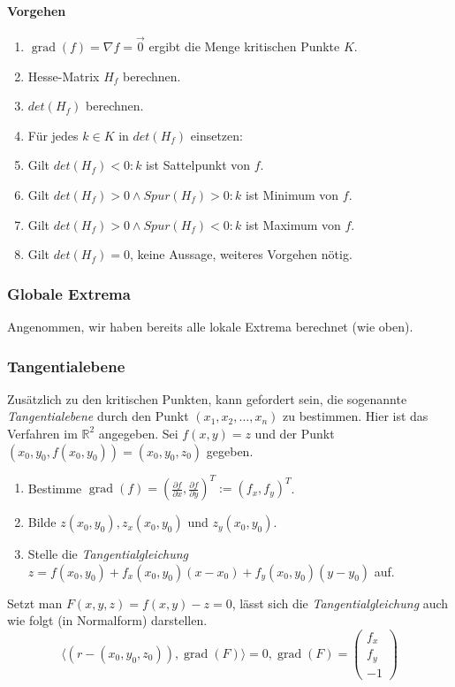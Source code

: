 \documentclass[a4paper, 9pt, DIV=24]{scrartcl}
\DeclareMathOperator{\grad}{grad}
\newcommand{\R}{\mathbb{R}}
\begin{document}
\paragraph{Vorgehen}
\begin{enumerate}[label={(}\arabic*{)}]
 \item $\grad(f) = \nabla f = \vec{0}$ ergibt die Menge kritischen Punkte $K$.
 \item Hesse-Matrix $H_f$ berechnen.
 \item $det(H_f)$ berechnen.
 \item Für jedes $k\in K$ in $det(H_f)$ einsetzen:
 \item Gilt $det(H_f) < 0: k$ ist Sattelpunkt von $f$.
 \item Gilt $det(H_f) > 0 \wedge Spur(H_f) > 0: k$ ist Minimum von $f$.
 \item Gilt $det(H_f) > 0 \wedge Spur(H_f) < 0: k$ ist Maximum von $f$.
 \item Gilt $det(H_f) = 0$, keine Aussage, weiteres Vorgehen nötig.
\end{enumerate}

\subsubsection{Globale Extrema}
Angenommen, wir haben bereits alle lokale Extrema berechnet (wie oben).

\subsubsection{Tangentialebene}
Zusätzlich zu den kritischen Punkten, kann gefordert sein, die sogenannte \emph{Tangentialebene} durch den Punkt $(x_1, x_2, \dots, x_n)$ zu bestimmen.
Hier ist das Verfahren im $\R^2$ angegeben.
Sei $f(x,y) = z$ und der Punkt $(x_0, y_0, f(x_0, y_0)) = (x_0, y_0, z_0)$ gegeben.
\begin{enumerate}[label={(}\arabic*{)}]
 \item Bestimme $\grad(f) = (\frac{\partial f}{\partial x}, \frac{\partial f}{\partial y})^T := (f_x, f_y)^T$.
 \item Bilde $z(x_0, y_0), z_x(x_0, y_0)$ und $z_y(x_0, y_0)$.
 \item Stelle die \emph{Tangentialgleichung} $z = f(x_0, y_0) + f_x(x_0, y_0)(x - x_0) + f_y(x_0, y_0)(y - y_0)$ auf.
\end{enumerate}
Setzt man $F(x,y,z) = f(x,y) - z = 0$, lässt sich die \emph{Tangentialgleichung} auch wie folgt (in Normalform) darstellen.
\[ \langle (r - (x_0, y_0, z_0)), \grad(F) \rangle = 0, \grad(F) = \begin{pmatrix}f_x \\ f_y \\ -1\end{pmatrix} \]
\end{document}
